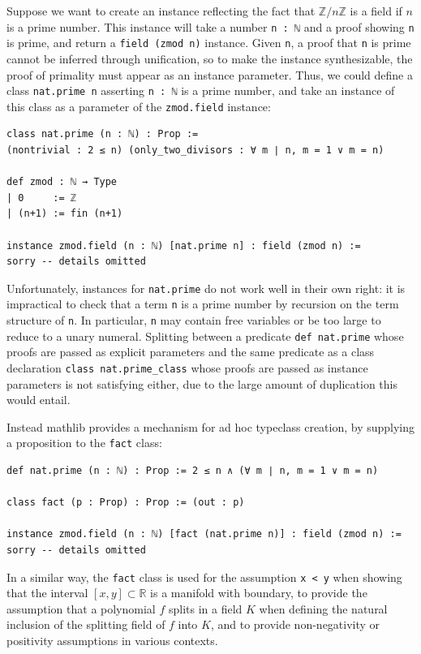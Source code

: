 \documentclass[a4paper,UKenglish,cleveref, autoref, thm-restate]{lipics-v2021}
\newcommand{\mathlib}{\textsf{mathlib}\xspace}
\newcommand{\R}{\mathbb{R}}
\newcommand{\Z}{\mathbb{Z}}
\begin{document}
Suppose we want to create an instance reflecting the fact that $\Z/n\Z$ is a field if $n$ is a prime number.
This instance will take a number \lstinline{n : ℕ} and a proof showing \lstinline{n} is prime,
and return a \lstinline{field (zmod n)} instance.
Given \lstinline{n}, a proof that \lstinline{n} is prime cannot be inferred through unification,
so to make the instance synthesizable, the proof of primality must appear as an instance parameter.
Thus, we could define a class \lstinline{nat.prime n} asserting \lstinline{n : ℕ} is a prime number,
and take an instance of this class as a parameter of the \lstinline{zmod.field} instance:
\begin{lstlisting}
class nat.prime (n : ℕ) : Prop :=
(nontrivial : 2 ≤ n) (only_two_divisors : ∀ m ∣ n, m = 1 ∨ m = n)

def zmod : ℕ → Type
| 0     := ℤ
| (n+1) := fin (n+1)

instance zmod.field (n : ℕ) [nat.prime n] : field (zmod n) :=
sorry -- details omitted
\end{lstlisting}
Unfortunately, instances for \lstinline{nat.prime} do not work well in their own right:
it is impractical to check that a term \lstinline{n} is a prime number by recursion on the term structure of \lstinline{n}.
In particular, \lstinline{n} may contain free variables or be too large to reduce to a unary numeral.
Splitting between a predicate \lstinline{def nat.prime} whose proofs are passed as explicit parameters
and the same predicate as a class declaration \lstinline{class nat.prime_class} whose proofs are passed as instance parameters is not satisfying either,
due to the large amount of duplication this would entail.

Instead \mathlib provides a mechanism for ad hoc typeclass creation,
by supplying a proposition to the \lstinline{fact} class:
\begin{lstlisting}
def nat.prime (n : ℕ) : Prop := 2 ≤ n ∧ (∀ m ∣ n, m = 1 ∨ m = n)

class fact (p : Prop) : Prop := (out : p)

instance zmod.field (n : ℕ) [fact (nat.prime n)] : field (zmod n) :=
sorry -- details omitted
\end{lstlisting}

In a similar way, the \lstinline{fact} class is used for the assumption \lstinline{x < y} when showing that the interval $[x, y] \subset \R$ is a manifold with boundary,
to provide the assumption that a polynomial $f$ splits in a field $K$ when defining the natural inclusion of the splitting field of $f$ into $K$,
and to provide non-negativity or positivity assumptions in various contexts.
\end{document}
